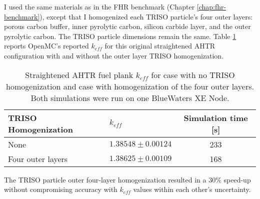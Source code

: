 I used the same materials as in the \gls{FHR} benchmark (Chapter \ref{chap:fhr-benchmark}), 
except that I homogenized each \gls{TRISO} particle's four outer layers: 
porous carbon buffer, inner pyrolytic carbon, silicon carbide layer, and the 
outer pyrolytic carbon. 
The \gls{TRISO} particle dimensions remain the same.
Table \ref{tab:keff_triso} reports OpenMC's reported $k_{eff}$ for this original 
straightened \gls{AHTR} configuration with and without the outer layer \gls{TRISO} 
homogenization.
\begin{table}[]
    \centering
    \onehalfspacing
    \caption{Straightened \acrfull{AHTR} fuel plank $k_{eff}$ for case with 
    no \gls{TRISO} homogenization and case with homogenization of the four outer 
    layers. Both simulations were run on one BlueWaters XE Node.}
	\label{tab:keff_triso}
    \footnotesize
    \begin{tabular}{llc}
    \hline 
    \textbf{TRISO Homogenization}& \textbf{$k_{eff}$} & \textbf{Simulation time [s]}  \\
    \hline 
    None & $1.38548 \pm 0.00124$ & 233\\ 
    Four outer layers & $1.38625 \pm 0.00109$ & 168\\ 
    \hline
    \end{tabular}
\end{table}
The \gls{TRISO} particle outer four-layer homogenization resulted in a $30\%$ 
speed-up without compromising accuracy with $k_{eff}$ values within each 
other's uncertainty.


